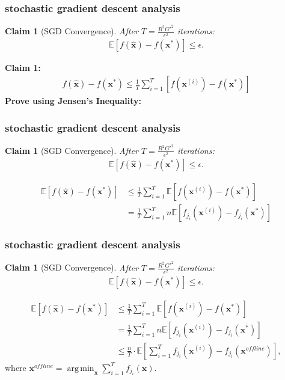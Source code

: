 \documentclass[compress]{beamer}
\newcommand{\bv}[1]{\mathbf{#1}}
\newcommand{\E}{\mathbb{E}}
\DeclareMathOperator*{\argmin}{arg\,min}
\newtheorem{claim}[theorem]{Claim}
\begin{document}
\begin{frame}[t]
	\frametitle{stochastic gradient descent analysis}
	\begin{claim}[SGD Convergence]
		After $T = \frac{R^2G'^2}{\epsilon^2}$ iterations:
		\begin{align*}
			\E\left[f(\hat{\bv{x}}) - f(\bv{x}^*)\right] \leq \epsilon.
		\end{align*}

	\end{claim}
	\textbf{Claim 1:} 
	\begin{align*}
		f(\hat{\bv{x}}) - f(\bv{x}^*) \leq \frac{1}{T}\sum_{i=1}^T\left[f(\bv{x}^{(i)}) -f(\bv{x}^*)\right]
	\end{align*}
\textbf{Prove using Jensen's Inequality:}
\end{frame}

\begin{frame}[t]
	\frametitle{stochastic gradient descent analysis}
	\small
	\begin{claim}[SGD Convergence]
		After $T = \frac{R^2G'^2}{\epsilon^2}$ iterations:
		\vspace{-1em}
		\begin{align*}
			\E\left[f(\hat{\bv{x}}) - f(\bv{x}^*)\right] \leq \epsilon.
		\end{align*}
	
		\vspace{-1em}
	\end{claim}\vspace{-2em}
	\begin{align*}
		\E[f(\hat{\bv{x}}) - f(\bv{x}^*)] &\leq \frac{1}{T}\sum_{i=1}^T\E\left[f(\bv{x}^{(i)}) -f(\bv{x}^*)\right]
		\\
		&=\frac{1}{T}\sum_{i=1}^Tn\E\left[f_{j_i}(\bv{x}^{(i)}) -f_{j_i}(\bv{x}^*)\right]
	\end{align*}
\end{frame}

\begin{frame}[t]
	\frametitle{stochastic gradient descent analysis}
	\small
	\begin{claim}[SGD Convergence]
		After $T = \frac{R^2G'^2}{\epsilon^2}$ iterations:
		\vspace{-1em}
		\begin{align*}
			\E\left[f(\hat{\bv{x}}) - f(\bv{x}^*)\right] \leq \epsilon.
		\end{align*}
		
		\vspace{-1em}
	\end{claim}\vspace{-2em}
	\begin{align*}
		\E[f(\hat{\bv{x}}) - f(\bv{x}^*)] &\leq \frac{1}{T}\sum_{i=1}^T\E\left[f(\bv{x}^{(i)}) -f(\bv{x}^*)\right]
		\\
		&=\frac{1}{T}\sum_{i=1}^Tn\E\left[f_{j_i}(\bv{x}^{(i)}) -f_{j_i}(\bv{x}^*)\right]\\
		&\leq \frac{n}{T}\cdot \E\left[\sum_{i=1}^T f_{j_i}(\bv{x}^{(i)}) -f_{j_i}(\bv{x}^{offline})\right], 
	\end{align*}
where $\bv{x}^{offline} = \argmin_{\bv{x}}\sum_{i=1}^{T} f_{j_i}(\bv{x})$.
\end{frame}
\end{document}
